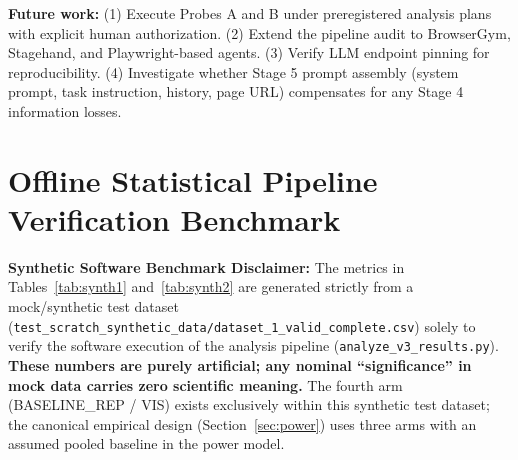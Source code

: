 \documentclass[conference]{IEEEtran}
\begin{document}
\textbf{Future work:} (1) Execute Probes A and B under preregistered analysis plans with explicit human authorization. (2) Extend the pipeline audit to BrowserGym, Stagehand, and Playwright-based agents. (3) Verify LLM endpoint pinning for reproducibility. (4) Investigate whether Stage 5 prompt assembly (system prompt, task instruction, history, page URL) compensates for any Stage 4 information losses.




\clearpage
\appendix

\section{Offline Statistical Pipeline Verification Benchmark}
\label{app:benchmark}

\textbf{Synthetic Software Benchmark Disclaimer:} The metrics in Tables~\ref{tab:synth1} and~\ref{tab:synth2} are generated strictly from a mock/synthetic test dataset (\texttt{test\_scratch\_synthetic\_data/dataset\_1\_valid\_complete.csv}) solely to verify the software execution of the analysis pipeline (\texttt{analyze\_v3\_results.py}). \textbf{These numbers are purely artificial; any nominal ``significance'' in mock data carries zero scientific meaning.} The fourth arm (\textsc{BASELINE\_REP / VIS}) exists exclusively within this synthetic test dataset; the canonical empirical design (Section~\ref{sec:power}) uses three arms with an assumed pooled baseline in the power model.
\end{document}
